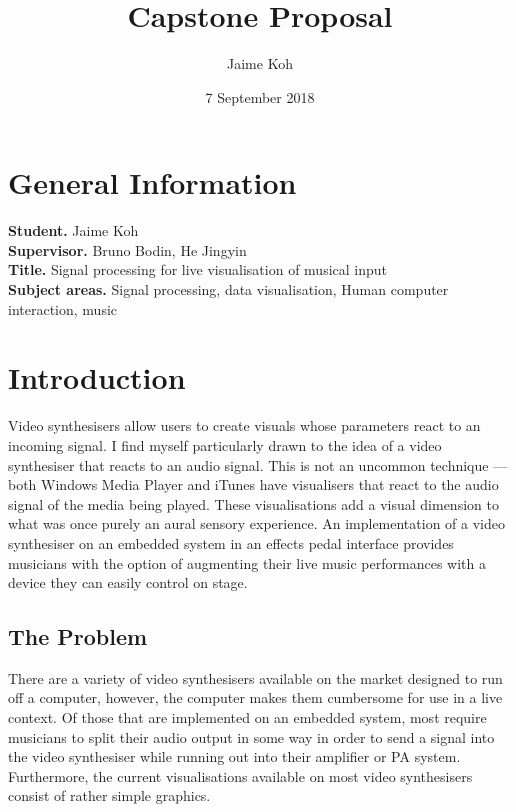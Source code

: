 \documentclass{article}
\title{Capstone Proposal}
\author{Jaime Koh}
\date{7 September 2018}
\begin{document}
\maketitle

\section{General Information}
	\textbf{Student.} Jaime Koh\\
	\textbf{Supervisor.} Bruno Bodin, He Jingyin\\
	\textbf{Title.} Signal processing for live visualisation of musical input\\
	\textbf{Subject areas.} Signal processing, data visualisation, Human computer interaction, music\\

\section{Introduction}
Video synthesisers allow users to create visuals whose parameters react to an incoming signal. I find myself particularly drawn to the idea of a video synthesiser that reacts to an audio signal. This is not an uncommon technique --- both Windows Media Player and iTunes have visualisers that react to the audio signal of the media being played. These visualisations add a visual dimension to what was once purely an aural sensory experience. An implementation of a video synthesiser on an embedded system in an effects pedal interface provides musicians with the option of augmenting their live music performances with a device they can easily control on stage.

\subsection{The Problem}
There are a variety of video synthesisers available on the market designed to run off a computer, however, the computer makes them cumbersome for use in a live context. Of those that are implemented on an embedded system, most require musicians to split their audio output in some way in order to send a signal into the video synthesiser while running out into their amplifier or PA system. Furthermore, the current visualisations available on most video synthesisers consist of rather simple graphics.\footnotemark

\end{document}
